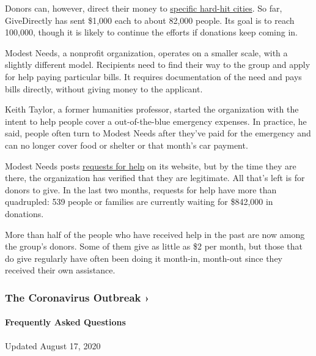 Donors can, however, direct their money to
\href{https://community.givedirectly.org/}{specific hard-hit cities}. So
far, GiveDirectly has sent \$1,000 each to about 82,000 people. Its goal
is to reach 100,000, though it is likely to continue the efforts if
donations keep coming in.

Modest Needs, a nonprofit organization, operates on a smaller scale,
with a slightly different model. Recipients need to find their way to
the group and apply for help paying particular bills. It requires
documentation of the need and pays bills directly, without giving money
to the applicant.

Keith Taylor, a former humanities professor, started the organization
with the intent to help people cover a out-of-the-blue emergency
expenses. In practice, he said, people often turn to Modest Needs after
they've paid for the emergency and can no longer cover food or shelter
or that month's car payment.

Modest Needs posts
\href{https://www.modestneeds.org/features/ledger/index.asp}{requests
for help} on its website, but by the time they are there, the
organization has verified that they are legitimate. All that's left is
for donors to give. In the last two months, requests for help have more
than quadrupled: 539 people or families are currently waiting for
\$842,000 in donations.

More than half of the people who have received help in the past are now
among the group's donors. Some of them give as little as \$2 per month,
but those that do give regularly have often been doing it month-in,
month-out since they received their own assistance.

\href{https://www.nytimes3xbfgragh.onion/news-event/coronavirus?action=click\&pgtype=Article\&state=default\&region=MAIN_CONTENT_3\&context=storylines_faq}{}

\hypertarget{the-coronavirus-outbreak-}{%
\subsubsection{The Coronavirus Outbreak
›}\label{the-coronavirus-outbreak-}}

\hypertarget{frequently-asked-questions}{%
\paragraph{Frequently Asked
Questions}\label{frequently-asked-questions}}

Updated August 17, 2020

